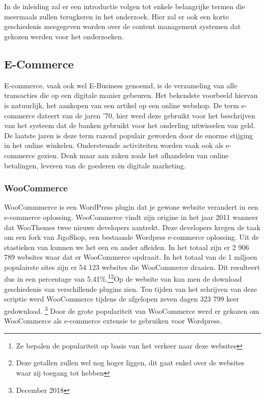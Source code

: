 \chapter{}
\label{ch:stand-van-zaken}


In de inleiding zal er een introductie volgen tot enkele belangrijke termen die meermaals zullen terugkeren in het onderzoek. Hier zal er ook een korte geschiedenis meegegeven worden over de content management systemen dat gekozen werden voor het onderzoeken.
\section{E-Commerce}
E-commerce, vaak ook wel E-Business genoemd, is de verzameling van alle transacties die op een digitale manier gebeuren. Het bekendste voorbeeld hiervan is natuurlijk, het aankopen van een artikel op een online webshop. De term e-commerce dateert van de jaren '70, hier werd deze gebruikt voor het beschrijven van het systeem dat de banken gebruikt voor het onderling uitwisselen van geld. De laatste jaren is deze term razend populair geworden door de enorme stijging in het online winkelen. Ondersteunde activiteiten worden vaak ook als e-commerce gezien. Denk maar aan zaken zoals het afhandelen van online betalingen, leveren van de goederen en digitale marketing. \autocite{MarketingTermen2018}
\subsection{WooCommerce}
WooCommmerce is een WordPress plugin dat je gewone website verandert in een e-commerce oplossing. WooCommerce vindt zijn origine in het jaar 2011 wanneer dat WooThemes twee nieuwe developers aantrekt. Deze developers kregen de taak om een fork van JigoShop, een bestaande Wordpess e-commerce oplossing. Uit de stastieken van \textcite{Builtwith2018a} kunnen we het een en ander afleiden. In het totaal zijn er 2 906 789 websites waar dat er WooCommerce opdraait. In het totaal van de 1 miljoen populairste sites zijn er 54 123 websites die WooCommerce draaien. Dit resulteert dus in een percentage van 5.41\%.\footnote{Ze bepalen de populariteit op basis van het verkeer naar deze websites}\footnote{Deze getallen zullen wel nog hoger liggen, dit gaat enkel over de websites waar zij toegang tot hebben}Op de website van \textcite{Wordpress2018} kan men de download geschiedenis van verschillende plugins zien. Ten tijden van het schrijven van deze scriptie werd WooCommerce tijdens de afgelopen zeven dagen 323 799 keer gedownload. \footnote{December 2018} Door de grote populariteit van WooCommerce werd er gekozen om WooCommerce als e-commerce extensie te gebruiken voor Wordpress.
